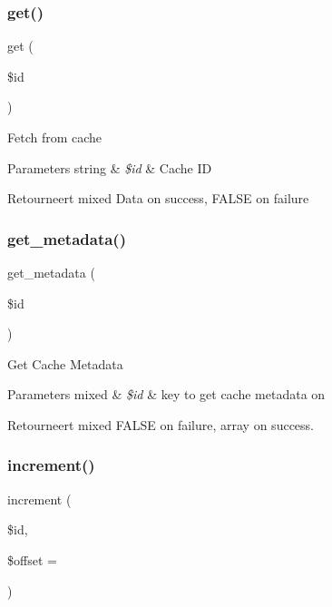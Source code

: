 \subsubsection{\texorpdfstring{get()}{get()}}
{\footnotesize\ttfamily get (\begin{DoxyParamCaption}\item[{}]{\$id }\end{DoxyParamCaption})}

Fetch from cache


\begin{DoxyParams}[1]{Parameters}
string & {\em \$id} & Cache ID \\
\hline
\end{DoxyParams}
\begin{DoxyReturn}{Retourneert}
mixed Data on success, F\+A\+L\+SE on failure 
\end{DoxyReturn}
\mbox{\label{class_c_i___cache__memcached_a59635cf18e997c5141bffa05ff7622e0}} 
\subsubsection{\texorpdfstring{get\_metadata()}{get\_metadata()}}
{\footnotesize\ttfamily get\+\_\+metadata (\begin{DoxyParamCaption}\item[{}]{\$id }\end{DoxyParamCaption})}

Get Cache Metadata


\begin{DoxyParams}[1]{Parameters}
mixed & {\em \$id} & key to get cache metadata on \\
\hline
\end{DoxyParams}
\begin{DoxyReturn}{Retourneert}
mixed F\+A\+L\+SE on failure, array on success. 
\end{DoxyReturn}
\mbox{\label{class_c_i___cache__memcached_a2f07a4e09b57f4460d49852497d1808f}} 
\subsubsection{\texorpdfstring{increment()}{increment()}}
{\footnotesize\ttfamily increment (\begin{DoxyParamCaption}\item[{}]{\$id,  }\item[{}]{\$offset = {} }\end{DoxyParamCaption})}


